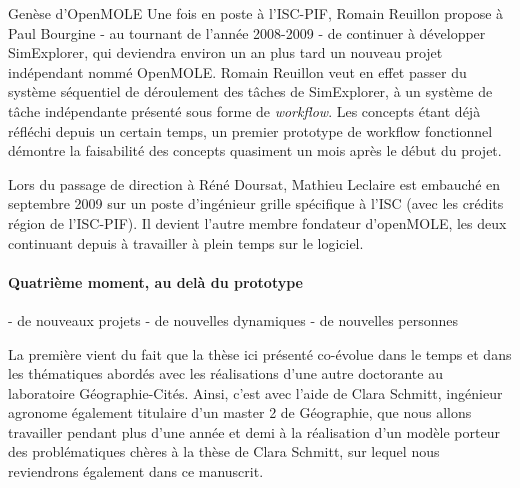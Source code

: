 \begin{framewithtitle}[geneseopenmole]{Genèse d'OpenMOLE}
Une fois en poste à l'ISC-PIF, Romain Reuillon propose à Paul Bourgine - au tournant de l'année 2008-2009 - de continuer à développer SimExplorer, qui deviendra environ un an plus tard un nouveau projet indépendant nommé OpenMOLE. Romain Reuillon veut en effet passer du système séquentiel de déroulement des tâches de SimExplorer, à un système de tâche indépendante présenté sous forme de \textit{workflow}. Les concepts étant déjà réfléchi depuis un certain temps, un premier prototype de workflow fonctionnel démontre la faisabilité des concepts quasiment un mois après le début du projet. 

Lors du passage de direction à Réné Doursat, Mathieu Leclaire est embauché en septembre 2009 sur un poste d'ingénieur grille spécifique à l'ISC (avec les crédits région de l'ISC-PIF). Il devient l'autre membre fondateur d'openMOLE, les deux continuant depuis à travailler à plein temps sur le logiciel.

\end{framewithtitle}



\paragraph{Quatrième moment, au delà du prototype}

 - de nouveaux projets
 - de nouvelles dynamiques
 - de nouvelles personnes


La première vient du fait que la thèse ici présenté co-évolue dans le temps et dans les thématiques abordés avec les réalisations d'une autre doctorante au laboratoire Géographie-Cités. Ainsi, c'est avec l'aide de Clara Schmitt, ingénieur agronome également titulaire d'un master 2 de Géographie, que nous allons travailler pendant plus d'une année et demi à la réalisation d'un modèle porteur des problématiques chères à la thèse de Clara Schmitt, sur lequel nous reviendrons également dans ce manuscrit.

